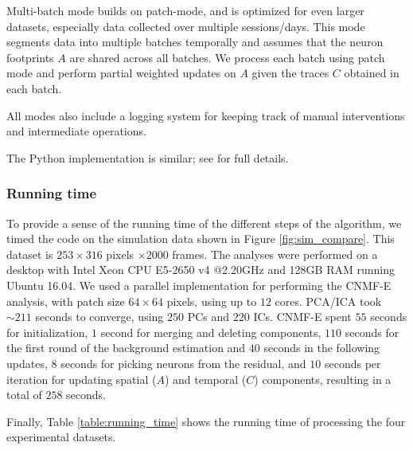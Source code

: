 \documentclass[9pt,lineno]{elife}
\begin{document}
Multi-batch mode builds on patch-mode, and is optimized for even larger datasets, especially data collected over multiple sessions/days. This mode segments data into multiple batches temporally and assumes that the neuron footprints $A$ are shared across all batches. We process each batch using patch mode and perform partial weighted updates on $A$ given the traces $C$ obtained in each batch. 

All modes also include a logging system for keeping track of manual interventions and intermediate operations. 

The Python implementation is similar; see \citep{giovannucci2017} for full details.

\subsubsection{Running time}
To provide a sense of the running time of the different steps of the algorithm, we timed the code on the simulation data shown in Figure \ref{fig:sim_compare}.  This dataset is $253\times 316$ pixels $\times 2000$ frames. The analyses were performed on a desktop with Intel Xeon CPU E5-2650 v4 @2.20GHz and 128GB RAM running Ubuntu 16.04. We used a parallel implementation for performing the CNMF-E analysis, with patch size $64\times 64$ pixels, using up to $12$ cores.
PCA/ICA took $\sim 211$ seconds to  converge, using $250$ PCs and $220$ ICs. CNMF-E spent $55$ seconds for initialization, $1$ second for merging and deleting components, $110$ seconds for the first round of the background estimation and $40$ seconds in the following updates, $8$ seconds for picking neurons from the residual, and $10$ seconds per iteration for updating spatial ($A$) and temporal ($C$) components, resulting in a total of $258$ seconds. 


Finally, Table \ref{table:running_time} shows the running time of processing the four experimental datasets. 
\end{document}
